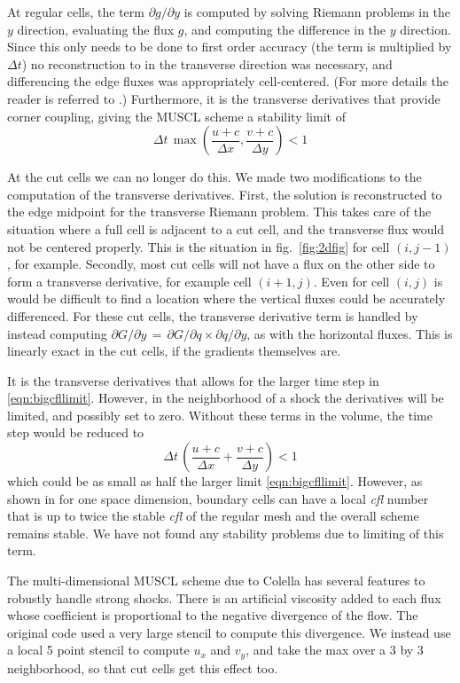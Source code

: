 At regular cells, the term $\partial g / \partial y$ is computed by solving Riemann
problems in the $y$ direction,  evaluating the flux $g$, and computing the
difference in the $y$ direction.
Since this only needs to be done to first order accuracy (the term is multiplied
by $\Delta t$)  no reconstruction to in the transverse direction was necessary,
and differencing the edge fluxes was appropriately cell-centered.
(For more details the reader is referred to \cite{Colella:Unsplit}.)
Furthermore, it is the transverse derivatives that provide corner coupling,
giving the MUSCL scheme a stability limit of
\begin{equation}
\label{eqn:bigcfllimit}
\Delta t \, \max \left (\frac{u+c}{\Delta x} , \frac{v+c}{\Delta y} \right) < 1
\end{equation}

At the cut cells we can no longer do this.  We made two modifications to the
computation of the transverse derivatives. First,
the solution is reconstructed to the edge midpoint  for the transverse Riemann problem.
This takes care of the situation where a full cell is adjacent to a cut cell, and
the transverse flux would not be centered properly. This is the situation
in fig.~\ref{fig:2dfig} for cell $(i,j-1)$, for example.
Secondly, most cut cells will not have a flux on the other side to form a
transverse derivative, for example cell $(i+1,j)$. Even for cell $(i,j)$ is would
be difficult to find a location where the vertical fluxes could be accurately differenced.
For these cut cells, the transverse derivative term is handled by instead computing
$ \partial G / \partial y \, = \,  \partial G / \partial q \times \partial q / \partial y$,
as with the horizontal fluxes. This is linearly exact in the cut cells, 
if the gradients themselves are.

It is the transverse derivatives that allows for the larger time step in
\eqref{eqn:bigcfllimit}.
However, in the neighborhood of a shock the derivatives will be limited, and
possibly set to zero.
Without these terms in the volume, the time step would be reduced to 
\begin{equation}
\Delta t \, \left (\frac{u+c}{\Delta x} + \frac{v+c}{\Delta y} \right) < 1
\end{equation}
which could be as small as half the larger limit \eqref{eqn:bigcfllimit}.
However, as shown in \cite{mjb:stability2} for one space dimension, 
boundary cells can have
a local {\em cfl} number that is up to twice the stable {\em cfl} of the regular
mesh and the overall scheme remains stable.  We have not found any stability
problems due to limiting of this term.  

The multi-dimensional MUSCL scheme due to Colella has several features to robustly
handle strong shocks. There is an artificial viscosity added to each flux whose
coefficient is proportional to the negative divergence of the flow.  The original
code used a very large stencil to compute this divergence. We instead use a local 5
point stencil to compute $u_x$ and $v_y$, and take the max over a 3 by 3
neighborhood, so that cut cells get this effect too.




